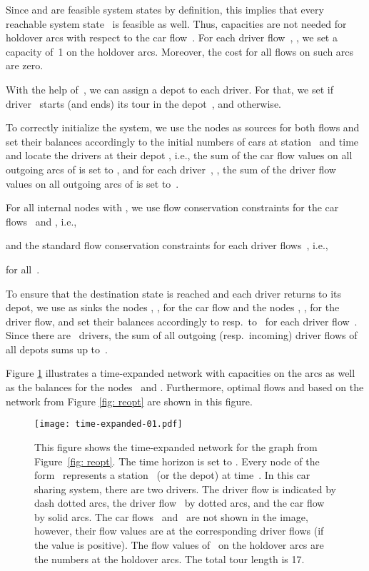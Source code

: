 \documentclass[english]{llncs}
\numberwithin{sublemma}{lemma}
\begin{document}
Since  and  are feasible system states by definition, this implies that every reachable system state~ is feasible as well.
Thus, capacities are not needed for holdover arcs with respect to the car flow~.
For each driver flow~, , we set a capacity of~1 on the holdover arcs.
Moreover, the cost for all flows on such arcs are zero.




With the help of~, we can assign a depot to each driver.
For that, we set  if driver~ starts (and ends) its tour in the depot~, and  otherwise.

To correctly initialize the system, we use the nodes  as sources for both flows and set their 
balances accordingly to the initial numbers of cars at station~ and time~ and locate the drivers at their depot , i.e.,
the sum of the car flow values on all outgoing arcs of  is set to , and for each driver~, , the sum of the driver flow values on all outgoing arcs of  is set to~.



For all internal nodes  with , we use flow conservation constraints for the car flows~ and , i.e.,

and the standard flow conservation constraints for each driver flows~, i.e.,

for all~.


To ensure that the destination state is reached and each driver returns to its depot, we use as sinks the nodes , , for the car flow 
and the nodes , , for the driver flow, and set their balances accordingly to  resp.~to~ for each driver flow~.
Since there are ~drivers, the sum of all outgoing (resp.~incoming) driver flows of all depots  sums up to~.


Figure \ref{fig: flownetwork} illustrates a time-expanded network with capacities on the arcs as well as the balances for the nodes~ and .
Furthermore, optimal flows  and  based on the network from Figure \ref{fig: reopt} are shown in this figure.


\begin{figure}
  \centering
  \texttt{[image: time-expanded-01.pdf]}
  \caption{This figure shows the time-expanded network  for the graph  from Figure~\ref{fig: reopt}.
    The time horizon is set to .
    Every node of the form~ represents a station~ (or the depot) at time~.
    In this car sharing system, there are two drivers.
    The driver flow  is indicated by dash dotted arcs, the driver flow~ by dotted arcs, and the car flow  by solid arcs.
    The car flows~ and~ are not shown in the image, however, their flow values are at the corresponding driver flows (if the value is positive).
    The flow values of~ on the holdover arcs are the numbers at the holdover arcs.
    The total tour length is 17.}
  \label{fig: flownetwork}
\end{figure}
\end{document}
